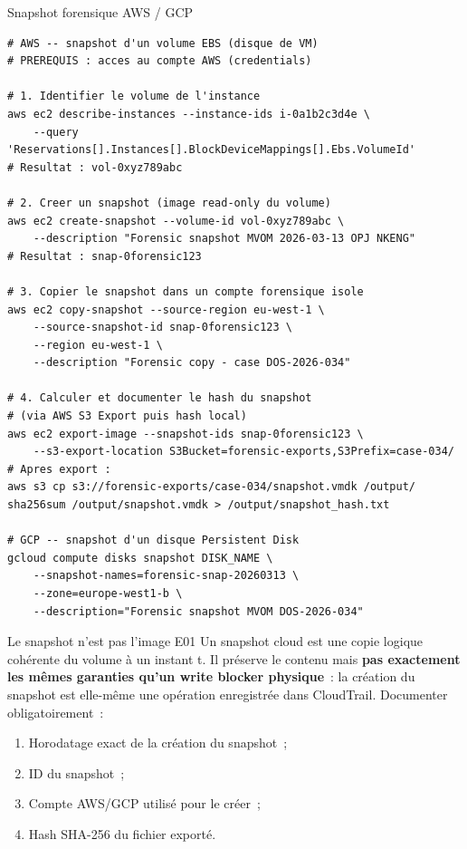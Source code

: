 \begin{boxoutils}{Snapshot forensique AWS / GCP}
\begin{lstlisting}[language=bash_forensique]
# AWS -- snapshot d'un volume EBS (disque de VM)
# PREREQUIS : acces au compte AWS (credentials)

# 1. Identifier le volume de l'instance
aws ec2 describe-instances --instance-ids i-0a1b2c3d4e \
    --query 'Reservations[].Instances[].BlockDeviceMappings[].Ebs.VolumeId'
# Resultat : vol-0xyz789abc

# 2. Creer un snapshot (image read-only du volume)
aws ec2 create-snapshot --volume-id vol-0xyz789abc \
    --description "Forensic snapshot MVOM 2026-03-13 OPJ NKENG"
# Resultat : snap-0forensic123

# 3. Copier le snapshot dans un compte forensique isole
aws ec2 copy-snapshot --source-region eu-west-1 \
    --source-snapshot-id snap-0forensic123 \
    --region eu-west-1 \
    --description "Forensic copy - case DOS-2026-034"

# 4. Calculer et documenter le hash du snapshot
# (via AWS S3 Export puis hash local)
aws ec2 export-image --snapshot-ids snap-0forensic123 \
    --s3-export-location S3Bucket=forensic-exports,S3Prefix=case-034/
# Apres export :
aws s3 cp s3://forensic-exports/case-034/snapshot.vmdk /output/
sha256sum /output/snapshot.vmdk > /output/snapshot_hash.txt

# GCP -- snapshot d'un disque Persistent Disk
gcloud compute disks snapshot DISK_NAME \
    --snapshot-names=forensic-snap-20260313 \
    --zone=europe-west1-b \
    --description="Forensic snapshot MVOM DOS-2026-034"
\end{lstlisting}
\end{boxoutils}

\begin{boiteRemarque}{Le snapshot n'est pas l'image E01}
Un snapshot cloud est une copie logique cohérente du volume à un instant t.
Il préserve le contenu mais \textbf{pas exactement les mêmes garanties
qu'un write blocker physique}~: la création du snapshot est elle-même
une opération enregistrée dans CloudTrail. Documenter obligatoirement~:
\begin{enumerate}
    \item Horodatage exact de la création du snapshot~;
    \item ID du snapshot~;
    \item Compte AWS/GCP utilisé pour le créer~;
    \item Hash SHA-256 du fichier exporté.
\end{enumerate}
\end{boiteRemarque}

